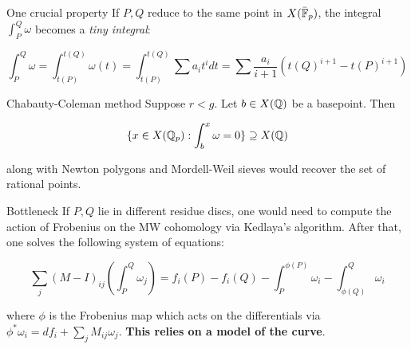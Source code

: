 \begin{frame}{One crucial property}
If $P,Q$ reduce to the same point in $X(\bar{\mathbb{F}}_p)$, the integral $\int_P^Q \omega$ becomes a \textit{tiny integral}:

\[
\int_P^Q \omega = \int_{t(P)}^{t(Q)} \omega(t) = \int_{t(P)}^{t(Q)} \sum a_i t^i dt = \sum \frac{a_i}{i+1} (t(Q)^{i+1} - t(P)^{i+1})
\]
\end{frame}


\begin{frame}{Chabauty-Coleman method}
Suppose $r < g$. Let $b \in X(\mathbb{Q})$ be a basepoint. Then

\[
\{ x \in X(\mathbb{Q}_p): \int_b^x \omega = 0 \} \supseteq X(\mathbb{Q})
\]

along with Newton polygons and Mordell-Weil sieves would recover the set of rational points.

\end{frame}

\begin{frame}{Bottleneck}
If $P,Q$ lie in different residue discs, one would need to compute the action of Frobenius on the MW cohomology via Kedlaya's algorithm. \pause After that, one solves the following system of equations:

\[
\sum_j (M - I)_{ij}(\int_P^Q \omega_j) = f_i(P) - f_i(Q) - \int_P^{\phi(P)} \omega_i - \int_{\phi(Q)}^Q \omega_i
\]

where $\phi$ is the Frobenius map which acts on the differentials via $\phi^* \omega_i = df_i + \sum_j M_{ij}\omega_j$. \textbf{This relies on a model of the curve}.
\end{frame}


